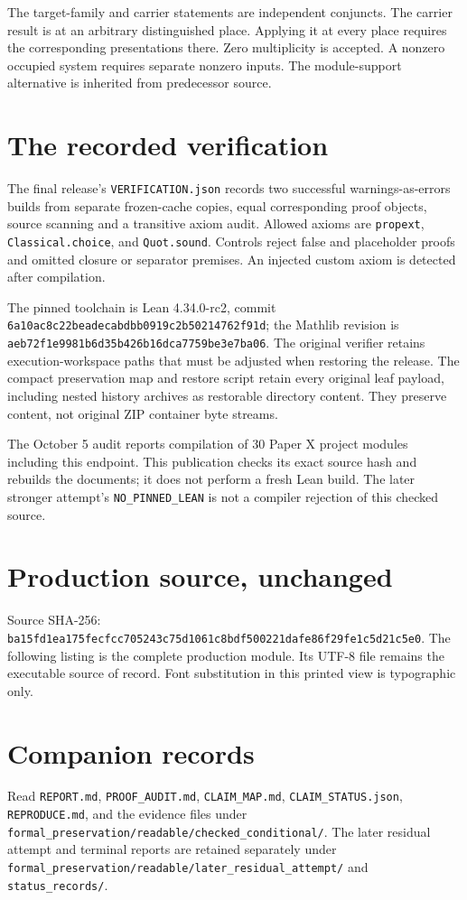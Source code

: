 \documentclass[11pt]{article}
\begin{document}
The target-family and carrier statements are independent conjuncts. The carrier result is at an arbitrary distinguished place. Applying it at every place requires the corresponding presentations there. Zero multiplicity is accepted. A nonzero occupied system requires separate nonzero inputs. The module-support alternative is inherited from predecessor source.
\section{The recorded verification}
The final release's \nolinkurl{VERIFICATION.json} records two successful warnings-as-errors builds from separate frozen-cache copies, equal corresponding proof objects, source scanning and a transitive axiom audit. Allowed axioms are \nolinkurl{propext}, \nolinkurl{Classical.choice}, and \nolinkurl{Quot.sound}. Controls reject false and placeholder proofs and omitted closure or separator premises. An injected custom axiom is detected after compilation.

The pinned toolchain is Lean 4.34.0-rc2, commit \nolinkurl{6a10ac8c22beadecabdbb0919c2b50214762f91d}; the Mathlib revision is \nolinkurl{aeb72f1e9981b6d35b426b16dca7759be3e7ba06}. The original verifier retains execution-workspace paths that must be adjusted when restoring the release. The compact preservation map and restore script retain every original leaf payload, including nested history archives as restorable directory content. They preserve content, not original ZIP container byte streams.

The October 5 audit reports compilation of 30 Paper X project modules including this endpoint. This publication checks its exact source hash and rebuilds the documents; it does not perform a fresh Lean build. The later stronger attempt's \nolinkurl{NO_PINNED_LEAN} is not a compiler rejection of this checked source.
\section{Production source, unchanged}
Source SHA-256: \nolinkurl{ba15fd1ea175fecfcc705243c75d1061c8bdf500221dafe86f29fe1c5d21c5e0}.
The following listing is the complete production module. Its UTF-8 file remains the executable source of record. Font substitution in this printed view is typographic only.
\section{Companion records}
Read \nolinkurl{REPORT.md}, \nolinkurl{PROOF_AUDIT.md}, \nolinkurl{CLAIM_MAP.md}, \nolinkurl{CLAIM_STATUS.json}, \nolinkurl{REPRODUCE.md}, and the evidence files under \nolinkurl{formal_preservation/readable/checked_conditional/}. The later residual attempt and terminal reports are retained separately under \nolinkurl{formal_preservation/readable/later_residual_attempt/} and \nolinkurl{status_records/}.
\end{document}
